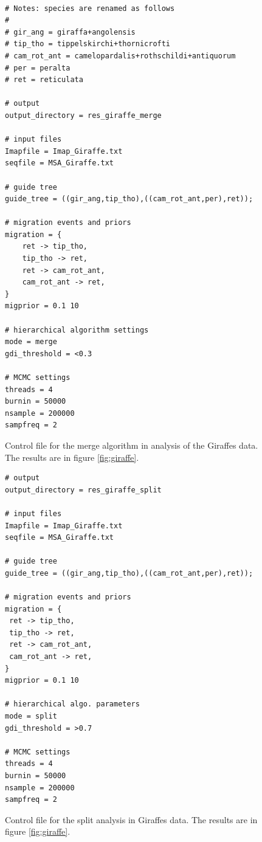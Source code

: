 \documentclass{article1}
\begin{document}
\begin{figure}[h]
\footnotesize
\begin{verbatim}

# Notes: species are renamed as follows
#
# gir_ang = giraffa+angolensis
# tip_tho = tippelskirchi+thornicrofti
# cam_rot_ant = camelopardalis+rothschildi+antiquorum
# per = peralta
# ret = reticulata
		
# output
output_directory = res_giraffe_merge

# input files
Imapfile = Imap_Giraffe.txt
seqfile = MSA_Giraffe.txt

# guide tree
guide_tree = ((gir_ang,tip_tho),((cam_rot_ant,per),ret));

# migration events and priors
migration = {
    ret -> tip_tho,
    tip_tho -> ret,
    ret -> cam_rot_ant,
    cam_rot_ant -> ret,
}
migprior = 0.1 10

# hierarchical algorithm settings
mode = merge
gdi_threshold = <0.3

# MCMC settings
threads = 4
burnin = 50000
nsample = 200000
sampfreq = 2
\end{verbatim}

\caption{Control file for the merge algorithm in analysis of the Giraffes data. The
results are in figure \ref{fig:giraffe}. %
} \label{fig:giraffe_mcf_merge}
\end{figure}

\begin{figure}[h]
\footnotesize
\begin{verbatim}
# output
output_directory = res_giraffe_split

# input files
Imapfile = Imap_Giraffe.txt
seqfile = MSA_Giraffe.txt

# guide tree
guide_tree = ((gir_ang,tip_tho),((cam_rot_ant,per),ret));

# migration events and priors
migration = {
 ret -> tip_tho,
 tip_tho -> ret,
 ret -> cam_rot_ant,
 cam_rot_ant -> ret,
}
migprior = 0.1 10

# hierarchical algo. parameters
mode = split
gdi_threshold = >0.7

# MCMC settings
threads = 4
burnin = 50000
nsample = 200000
sampfreq = 2
\end{verbatim}

\caption{Control file for the split analysis in Giraffes data.  The results are in
figure \ref{fig:giraffe}. %
} \label{fig:giraffe_mcf_split}
\end{figure}
\end{document}
